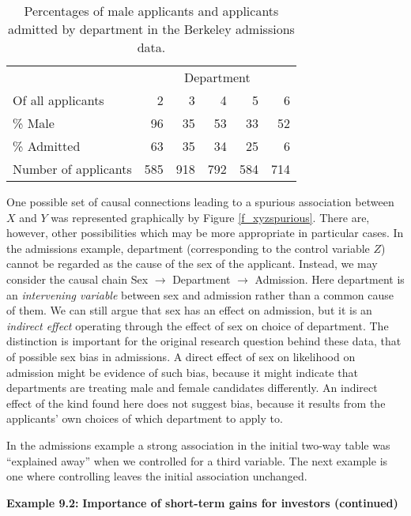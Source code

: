 \begin{table}
\caption{Percentages of male applicants and applicants admitted by
department in the Berkeley admissions data.}
\label{t_berkeley3}
\begin{center}
\begin{tabular}{|l|rrrrr|}\hline
& \multicolumn{5}{|c|}{Department}\\
Of all applicants & 2 & 3 & 4 & 5 & 6 \\ \hline
\% Male & 96 & 35 & 53 & 33 & 52 \\
\% Admitted & 63 & 35 & 34 & 25 & 6 \\
\hline
Number of applicants & 585 & 918 & 792 & 584 & 714 \\
\hline
\end{tabular}
\end{center}

\end{table}

One possible set of causal connections leading to a spurious association
between $X$ and $Y$ was represented graphically by Figure
\ref{f_xyzspurious}. There are, however, other possibilities which may
be more appropriate in particular cases. In the admissions example,
department (corresponding to the control variable $Z$) cannot be
regarded as the cause of the sex of the applicant. Instead, we may
consider the causal chain Sex $\longrightarrow$ Department
$\longrightarrow$ Admission. Here department is an \emph{intervening
variable} between sex and admission rather than a common cause of them.
We can still argue that sex has an effect on admission, but it is an
\emph{indirect effect} operating through the effect of sex on choice of
department. The distinction is important for the original research question
behind these data, that of possible sex bias in admissions.
A direct effect of sex on likelihood on admission might be evidence of
such bias, because it might indicate that departments are treating male
and female candidates differently. An indirect effect of the kind found
here does not suggest bias, because it results from the applicants' own
choices of which department to apply to.

In the admissions example a strong association in the initial two-way
table was ``explained away'' when we controlled for a third variable.
The next example is one where controlling leaves the initial association
unchanged.

\textbf{Example 9.2:}
\textbf{Importance of short-term gains
for investors (continued)}

